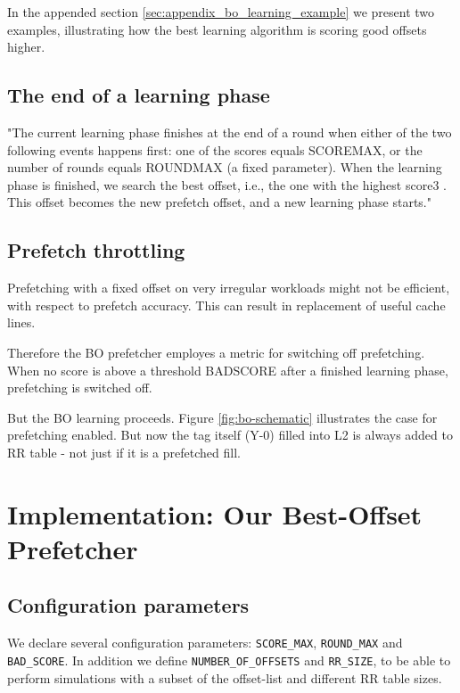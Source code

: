 \documentclass[conference]{IEEEtran}
\begin{document}
In the appended section \ref{sec:appendix_bo_learning_example} we present two examples, illustrating how the best learning algorithm is scoring good offsets higher.

\subsection{The end of a learning phase}

"The current learning phase finishes at the end of a round
when either of the two following events happens first: one
of the scores equals SCOREMAX, or the number of rounds
equals ROUNDMAX (a fixed parameter). When the learning phase is finished, we search the best offset, i.e., the one
with the highest score3 . This offset becomes the new prefetch
offset, and a new learning phase starts."\cite{BOP_2016}

\subsection{Prefetch throttling}

Prefetching with a fixed offset on very irregular workloads might not be efficient,
with respect to prefetch accuracy. This can result in replacement of useful cache lines.

Therefore the BO prefetcher employes a metric for switching off prefetching.
When no score is above a threshold BADSCORE after a finished learning phase, prefetching is switched off.

But the BO learning proceeds.
Figure \ref{fig:bo-schematic} illustrates the case for prefetching enabled.
But now the tag itself (Y-0) filled into L2 is always added to RR table - not just if it is a prefetched fill.


\section{Implementation: Our Best-Offset Prefetcher}

\subsection{Configuration parameters}

We declare several configuration parameters: \texttt{SCORE\_MAX}, \texttt{ROUND\_MAX} and \texttt{BAD\_SCORE}.
In addition we define \texttt{NUMBER\_OF\_OFFSETS} and \texttt{RR\_SIZE}, to be able
to perform simulations with a subset of the offset-list and different RR table sizes.
\end{document}
